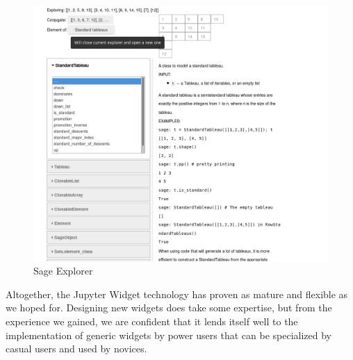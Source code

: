 \documentclass{deliverablereport}
\begin{document}
\begin{figure}[h]
  \begin{center}
    \includegraphics[width=\textwidth]{images/TableauExplorer}
  \end{center}
  \caption{Sage Explorer}
  \label{fig:tableau-explorer}
\end{figure}


Altogether, the Jupyter Widget technology has proven as mature and
flexible as we hoped for. Designing new widgets does take some
expertise, but from the experience we gained, we are confident that it
lends itself well to the implementation of generic widgets by power
users that can be specialized by casual users and used by novices.
\end{document}
